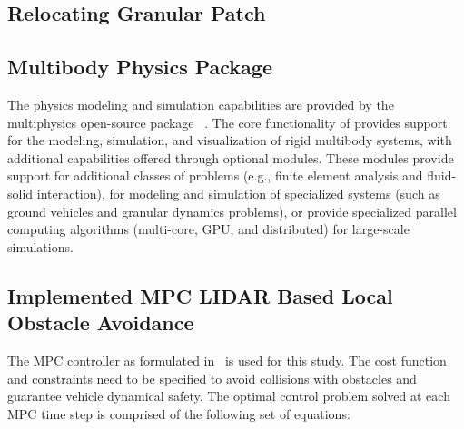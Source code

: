 \documentclass[12pt,twocolumn]{article}
\newcommand{\CHRONO}{{\sffamily{{Chrono}}}}
\begin{document}

\subsection{Relocating Granular Patch }\label{ss:Patch}


\subsection{{\CHRONO} Multibody Physics Package}\label{ss:Chrono}

The physics modeling and simulation capabilities are provided by the multiphysics open-source package {\CHRONO}~\cite{Chrono2016}. The core functionality of {\CHRONO} provides support for the modeling, simulation, and visualization of rigid multibody systems, with additional capabilities offered through optional modules. These modules provide support for additional classes of problems (e.g., finite element analysis and fluid-solid interaction), for modeling and simulation of specialized systems (such as ground vehicles and granular dynamics problems), or provide specialized parallel computing algorithms (multi-core, GPU, and distributed) for large-scale simulations.

\subsection{Implemented MPC LIDAR Based Local Obstacle Avoidance}\label{ss:MPCImplementation}

The MPC controller as formulated in~\cite{ModelFidelity2016} is used for this study. The cost function and constraints need to be specified to avoid collisions with obstacles and guarantee vehicle dynamical safety. The optimal control problem solved at each MPC time step is comprised of the following set of equations:
\end{document}
